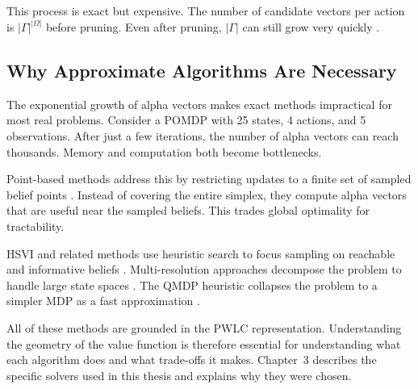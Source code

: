 This process is exact but expensive.
The number of candidate vectors per action is $|\Gamma|^{|\Omega|}$ before pruning.
Even after pruning, $|\Gamma|$ can still grow very quickly \cite{incrementalPruningNotes}.


\subsection{Why Approximate Algorithms Are Necessary}

The exponential growth of alpha vectors makes exact methods impractical for most real problems.
Consider a POMDP with 25 states, 4 actions, and 5 observations.
After just a few iterations, the number of alpha vectors can reach thousands.
Memory and computation both become bottlenecks.

Point-based methods address this by restricting updates to a finite set of sampled belief points \cite{pineauPointbasedValueIteration,spaanPerseusRandomizedPointbased2005}.
Instead of covering the entire simplex, they compute alpha vectors that are useful near the sampled beliefs.
This trades global optimality for tractability.

HSVI and related methods use heuristic search to focus sampling on reachable and informative beliefs \cite{smithHeuristicSearchValue}.
Multi-resolution approaches decompose the problem to handle large state spaces \cite{zhengMultiResolutionPOMDPPlanning2022}.
The QMDP heuristic collapses the problem to a simpler MDP as a fast approximation \cite{zhangModelApproximationScheme1997}.

All of these methods are grounded in the PWLC representation.
Understanding the geometry of the value function is therefore essential for understanding what each algorithm does and what trade-offs it makes.
Chapter~3 describes the specific solvers used in this thesis and explains why they were chosen.
